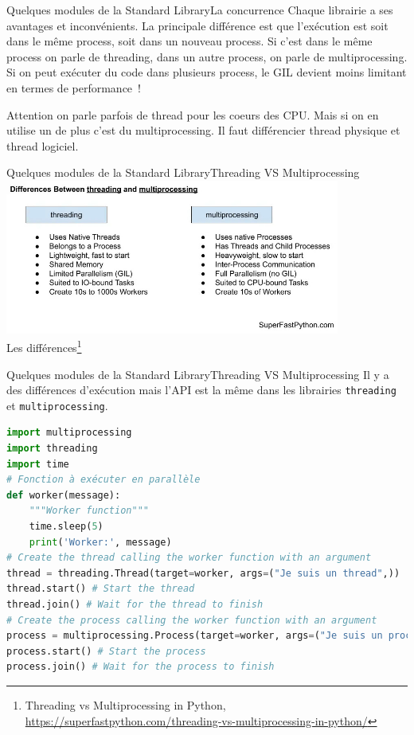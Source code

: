 \documentclass{beamer}
\begin{document}
    \begin{frame}{Quelques modules de la Standard Library}{La concurrence}
        Chaque librairie a ses avantages et inconvénients.
        La principale différence est que l'exécution est soit dans le même process, soit dans un nouveau process.
        \bigbreak
        Si c'est dans le même process on parle de threading, dans un autre process, on parle de multiprocessing.
        \bigbreak
        Si on peut exécuter du code dans plusieurs process, le GIL devient moins limitant en termes de performance~!
        \begin{dangercolorbox}
            Attention on parle parfois de thread pour les coeurs des CPU. Mais si on en utilise un de plus c'est du multiprocessing.
            Il faut différencier thread physique et thread logiciel.
        \end{dangercolorbox}
    \end{frame}

    \begin{frame}{Quelques modules de la Standard Library}{Threading VS Multiprocessing}
        \centering
        \includegraphics[width=11cm]{image/threading-vs-multiprocessing} \\ Les différences\footnote{Threading vs Multiprocessing in Python, \url{https://superfastpython.com/threading-vs-multiprocessing-in-python/}} \\
    \end{frame}

    \begin{frame}[fragile]{Quelques modules de la Standard Library}{Threading VS Multiprocessing}
        Il y a des différences d'exécution mais l'API est la même dans les librairies \lstinline{threading} et \lstinline{multiprocessing}.
        \begin{lstlisting}[language=Python]
import multiprocessing
import threading
import time
# Fonction à exécuter en parallèle
def worker(message):
    """Worker function"""
    time.sleep(5)
    print('Worker:', message)
# Create the thread calling the worker function with an argument
thread = threading.Thread(target=worker, args=("Je suis un thread",))
thread.start() # Start the thread
thread.join() # Wait for the thread to finish
# Create the process calling the worker function with an argument
process = multiprocessing.Process(target=worker, args=("Je suis un process",))
process.start() # Start the process
process.join() # Wait for the process to finish
        \end{lstlisting}
    \end{frame}
\end{document}
